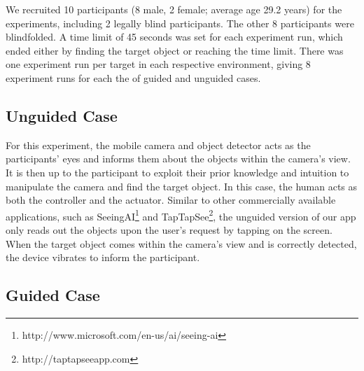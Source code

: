 \documentclass[runningheads]{llncs}
\DeclareRobustCommand{\tofix}[1]{{\sethlcolor{yellow}\hl{[#1]}}}
\begin{document}
We recruited 10 participants (8 male, 2 female; average age 29.2 years) for the experiments, including 2 legally blind participants. 
The other 8 participants were blindfolded. 
A time limit of 45 seconds was set for each experiment run, which ended either by finding the target object or reaching the time limit.
There was one experiment run per target in each respective environment, giving 8 experiment runs for each the of guided and unguided cases. %

\subsection{Unguided Case}


For this experiment, the mobile camera and object detector acts as the participants' eyes and informs them about the objects within the camera's view.
It is then up to the participant to exploit their prior knowledge and intuition to manipulate the camera and find the target object. 
In this case, the human acts as both the controller and the actuator. 
Similar to other commercially available applications, such as SeeingAI\footnote{http://www.microsoft.com/en-us/ai/seeing-ai} and TapTapSee\footnote{http://taptapseeapp.com}, the unguided version of our app only reads out the objects upon the user's request by tapping on the screen. 
When the target object comes within the camera's view and is correctly detected, the device vibrates to inform the participant. 


\subsection{Guided Case}
\end{document}

